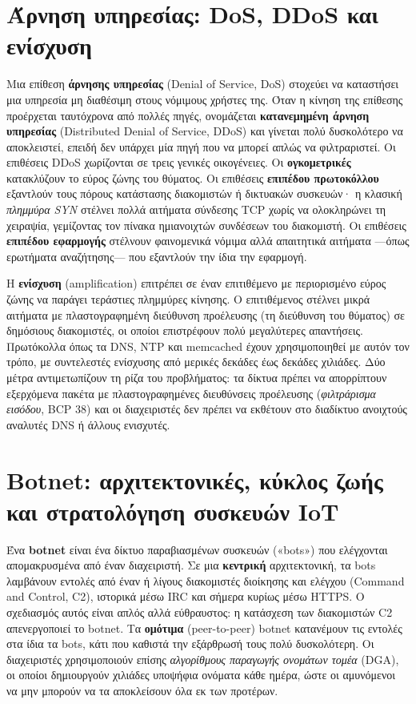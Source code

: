 \section{Άρνηση υπηρεσίας: DoS, DDoS και ενίσχυση}\label{sec:6.1}
Μια επίθεση \textbf{άρνησης υπηρεσίας} (Denial of Service, DoS) στοχεύει να καταστήσει μια υπηρεσία μη διαθέσιμη στους νόμιμους χρήστες της. Όταν η κίνηση της επίθεσης προέρχεται ταυτόχρονα από πολλές πηγές, ονομάζεται \textbf{κατανεμημένη άρνηση υπηρεσίας} (Distributed Denial of Service, DDoS) και γίνεται πολύ δυσκολότερο να αποκλειστεί, επειδή δεν υπάρχει μία πηγή που να μπορεί απλώς να φιλτραριστεί. Οι επιθέσεις DDoS χωρίζονται σε τρεις γενικές οικογένειες. Οι \textbf{ογκομετρικές} κατακλύζουν το εύρος ζώνης του θύματος. Οι επιθέσεις \textbf{επιπέδου πρωτοκόλλου} εξαντλούν τους πόρους κατάστασης διακομιστών ή δικτυακών συσκευών· η κλασική \emph{πλημμύρα SYN} στέλνει πολλά αιτήματα σύνδεσης TCP χωρίς να ολοκληρώνει τη χειραψία, γεμίζοντας τον πίνακα ημιανοιχτών συνδέσεων του διακομιστή. Οι επιθέσεις \textbf{επιπέδου εφαρμογής} στέλνουν φαινομενικά νόμιμα αλλά απαιτητικά αιτήματα —όπως ερωτήματα αναζήτησης— που εξαντλούν την ίδια την εφαρμογή.

Η \textbf{ενίσχυση} (amplification) επιτρέπει σε έναν επιτιθέμενο με περιορισμένο εύρος ζώνης να παράγει τεράστιες πλημμύρες κίνησης. Ο επιτιθέμενος στέλνει μικρά αιτήματα με πλαστογραφημένη διεύθυνση προέλευσης (τη διεύθυνση του θύματος) σε δημόσιους διακομιστές, οι οποίοι επιστρέφουν πολύ μεγαλύτερες απαντήσεις. Πρωτόκολλα όπως τα DNS, NTP και memcached έχουν χρησιμοποιηθεί με αυτόν τον τρόπο, με συντελεστές ενίσχυσης από μερικές δεκάδες έως δεκάδες χιλιάδες. Δύο μέτρα αντιμετωπίζουν τη ρίζα του προβλήματος: τα δίκτυα πρέπει να απορρίπτουν εξερχόμενα πακέτα με πλαστογραφημένες διευθύνσεις προέλευσης (\emph{φιλτράρισμα εισόδου}, BCP 38) και οι διαχειριστές δεν πρέπει να εκθέτουν στο διαδίκτυο ανοιχτούς αναλυτές DNS ή άλλους ενισχυτές.

\section{Botnet: αρχιτεκτονικές, κύκλος ζωής και στρατολόγηση συσκευών IoT}\label{sec:6.2}
Ένα \textbf{botnet} είναι ένα δίκτυο παραβιασμένων συσκευών («bots») που ελέγχονται απομακρυσμένα από έναν διαχειριστή. Σε μια \textbf{κεντρική} αρχιτεκτονική, τα bots λαμβάνουν εντολές από έναν ή λίγους διακομιστές διοίκησης και ελέγχου (Command and Control, C2), ιστορικά μέσω IRC και σήμερα κυρίως μέσω HTTPS. Ο σχεδιασμός αυτός είναι απλός αλλά εύθραυστος: η κατάσχεση των διακομιστών C2 απενεργοποιεί το botnet. Τα \textbf{ομότιμα} (peer-to-peer) botnet κατανέμουν τις εντολές στα ίδια τα bots, κάτι που καθιστά την εξάρθρωσή τους πολύ δυσκολότερη. Οι διαχειριστές χρησιμοποιούν επίσης \emph{αλγορίθμους παραγωγής ονομάτων τομέα} (DGA), οι οποίοι δημιουργούν χιλιάδες υποψήφια ονόματα κάθε ημέρα, ώστε οι αμυνόμενοι να μην μπορούν να τα αποκλείσουν όλα εκ των προτέρων.

